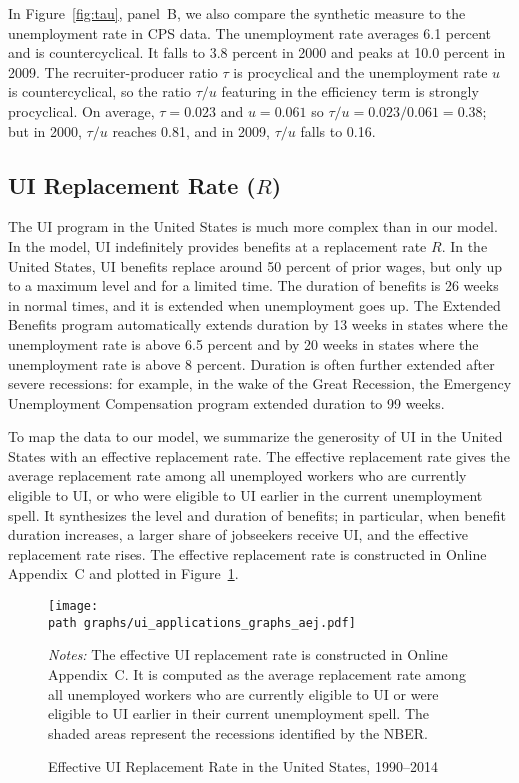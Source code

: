 \documentclass[letterpaper,12pt,leqno]{article}
\def\path{../}
\newcommand{\fignotes}[1]{\centering\parbox[c]{\textwidth}{\footnotesize \textit{Notes:} #1}}
\begin{document}
In Figure~\ref{fig:tau}, panel~B, we also compare the synthetic measure to the unemployment rate in CPS data. The unemployment rate averages 6.1 percent and is countercyclical. It falls to 3.8 percent in 2000 and peaks at 10.0 percent in 2009. The recruiter-producer ratio $\tau$ is procyclical and the unemployment rate $u$ is countercyclical, so the ratio $\tau/u$ featuring in the efficiency term is strongly procyclical. On average, $\tau=0.023$ and $u=0.061$ so $\tau/u=0.023/0.061=0.38$; but in 2000, $\tau/u$ reaches 0.81, and in 2009, $\tau/u$ falls to 0.16.

\subsection{UI Replacement Rate ($R$)}
 
The UI program in the United States is much more complex than in our model. In the model, UI indefinitely provides benefits at a replacement rate $R$. In the United States, UI benefits replace around 50 percent of prior wages, but only up to a maximum level and for a limited time. The duration of benefits is 26 weeks in normal times, and it is extended when unemployment goes up. The Extended Benefits program automatically extends duration by 13 weeks in states where the unemployment rate is above 6.5 percent and by 20 weeks in states where the unemployment rate is above 8 percent. Duration is often further extended after severe recessions: for example, in the wake of the Great Recession, the Emergency Unemployment Compensation program extended duration to 99 weeks.

To map the data to our model, we summarize the generosity of UI in the United States with an effective replacement rate. The effective replacement rate gives the average replacement rate among all unemployed workers who are currently eligible to UI, or who were eligible to UI earlier in the current unemployment spell. It synthesizes the level and duration of benefits; in particular, when benefit duration increases, a larger share of jobseekers receive UI, and the effective replacement rate rises. The effective replacement rate is constructed in Online Appendix~C and plotted in Figure~\ref{fig:replacement}.

\begin{figure}[t] \centering
\texttt{[image: \\path graphs/ui\_applications\_graphs\_aej.pdf]}
\caption{Effective UI Replacement Rate in the United States, 1990--2014}
\fignotes{The effective UI replacement rate is constructed in Online Appendix~C. It is computed as the average replacement rate among all unemployed workers who are currently eligible to UI or were eligible to UI earlier in their current unemployment spell. The shaded areas represent the recessions identified by the NBER.}
\label{fig:replacement}\end{figure}
\end{document}

